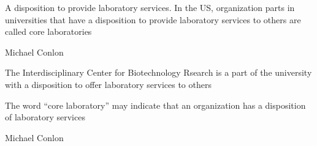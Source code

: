 \documentclass[letterpaper,10pt,english]{sphinxmanual}
\begin{document}
\begin{sphinxShadowBox}

\sphinxAtStartPar
{\hyperref[\detokenize{doc-ORG_0000010::doc}]{}}
\end{sphinxShadowBox}

\begin{sphinxShadowBox}

\sphinxAtStartPar
A disposition to provide laboratory services.  In the US, organization parts in universities that have a disposition to provide laboratory services to others are called core laboratories
\end{sphinxShadowBox}

\begin{sphinxShadowBox}

\sphinxAtStartPar
Michael Conlon 
\end{sphinxShadowBox}

\begin{sphinxShadowBox}

\sphinxAtStartPar
The Interdisciplinary Center for Biotechnology Rsearch is a part of the university with a disposition to offer laboratory services to others
\end{sphinxShadowBox}

\begin{sphinxShadowBox}

\sphinxAtStartPar
The word “core laboratory” may indicate that an organization has a disposition of laboratory services
\end{sphinxShadowBox}

\begin{sphinxShadowBox}

\sphinxAtStartPar
Michael Conlon 
\end{sphinxShadowBox}
\begin{quote}

\ignorespaces \end{quote}
\end{document}
